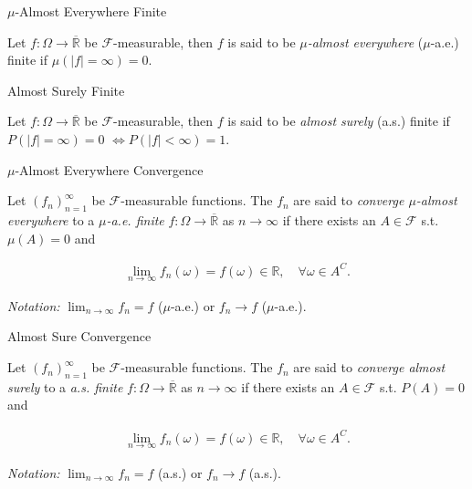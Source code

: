 \documentclass[10pt,landscape]{article}
\newcommand{\CalF}{\mathcal{F}}
\begin{document}
\begin{multicols}{3}
\begin{definition}{}{$\mu$-Almost Everywhere Finite}

    Let $f: \Omega \to \overline{\mathbb{R}}$ be $\CalF$-measurable, then $f$ is said to be \emph{$\mu$-almost everywhere} ($\mu$-a.e.) finite if $\mu(|f| = \infty) = 0$.

\end{definition}

\begin{definition}{}{Almost Surely Finite}

    Let $f: \Omega \to \overline{\mathbb{R}}$ be $\CalF$-measurable, then $f$ is said to be \emph{almost surely} (a.s.) finite if $P(|f| = \infty) = 0$ $\Leftrightarrow P(|f| < \infty) = 1$.

\end{definition}

\begin{definition}{5.1}{$\mu$-Almost Everywhere Convergence}

    Let $(f_n)_{n=1}^{\infty}$ be $\CalF$-measurable functions. The $f_n$ are said to \emph{converge $\mu$-almost everywhere} to a \emph{$\mu$-a.e. finite} $f: \Omega \to \overline{\mathbb{R}}$ as $n \to \infty$ if there exists an $A \in \CalF$ s.t. $\mu(A) = 0$ and

        \begin{align*}
            \lim_{n \to \infty} f_n(\omega) = f(\omega) \in \mathbb{R}, \quad \forall \omega \in A^C.
        \end{align*}

    \emph{Notation:} $\lim_{n \to \infty} f_n = f$ ($\mu$-a.e.) or $f_n \to f$ ($\mu$-a.e.).

\end{definition}

\begin{definition}{5.1}{Almost Sure Convergence}

    Let $(f_n)_{n=1}^{\infty}$ be $\CalF$-measurable functions. The $f_n$ are said to \emph{converge almost surely} to a \emph{a.s. finite} $f: \Omega \to \overline{\mathbb{R}}$ as $n \to \infty$ if there exists an $A \in \CalF$ s.t. $P(A) = 0$ and

        \begin{align*}
            \lim_{n \to \infty} f_n(\omega) = f(\omega) \in \mathbb{R}, \quad \forall \omega \in A^C.
        \end{align*}

    \emph{Notation:} $\lim_{n \to \infty} f_n = f$ (a.s.) or $f_n \to f$ (a.s.).


\end{definition}
\end{multicols}
\end{document}
